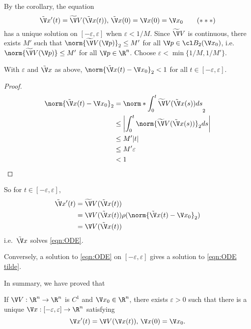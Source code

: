 \documentclass[a4paper]{article}
\theoremstyle{definition}
\begin{document}
By the corollary, the equation
\begin{equation*}
  \label{eqn:ODE tilde}
  \tilde \V x'(t) = \widetilde \V V(\tilde \V x(t)), \, \tilde \V x(0) = \V x(0) = \V x_0
  \tag{\(\ast\ast\ast\)}
\end{equation*}
has a unique solution on \([-\varepsilon, \varepsilon]\) when \(\varepsilon < 1/M\). Since \(\widetilde \V V\) is continuous, there exists \(M'\) such that \(\norm{\widetilde \V V(\V p)}_2 \leq M'\) for all \(\V p \in \cl B_2(\V x_0)\), i.e.\ \(\norm{\widetilde \V V(\V p)} \leq M'\) for all \(\V p \in \R^n\). Choose \(\varepsilon < \min\{1/M, 1/M'\}\).

\begin{lemma}
  With \(\varepsilon\) and \(\tilde \V x\) as above, \(\norm{\tilde \V x(t) - \V x_0}_2 < 1\) for all \(t \in [-\varepsilon, \varepsilon]\).
\end{lemma}

\begin{proof}
  \begin{align*}
    \norm{\tilde \V x(t) - \V x_0}_2 &= \norm*{\int_0^t \widetilde \V V(\tilde \V x(s)) ds}_2 \\
                                     &\leq \left| \int_0^t \norm{\widetilde \V V(\tilde \V x(s))}_2 ds \right| \\
                                     &\leq M'|t| \\
                                     &\leq M'\varepsilon \\
                                     &< 1
  \end{align*}
\end{proof}

So for \(t \in [-\varepsilon, \varepsilon]\),
\begin{align*}
  \tilde \V x'(t) &= \widetilde \V V(\tilde \V x(t)) \\
                  &= \V V(\tilde \V x(t)) \rho(\norm{\tilde \V x(t) - \V x_0}_2) \\
                  &= \V V(\tilde \V x(t))
\end{align*}
i.e.\ \(\tilde \V x\) solves \eqref{eqn:ODE}.

Conversely, a solution to \eqref{eqn:ODE} on \([-\varepsilon, \varepsilon]\) gives a solution to \eqref{eqn:ODE tilde}.

In summary, we have proved that

\begin{theorem}
  If \(\V V: \R^n \to \R^n\) is \(C^1\) and \(\V x_0 \in \R^n\), there exists \(\varepsilon > 0\) such that there is a unique \(\V x: [-\varepsilon, \varepsilon] \to \R^n\) satisfying
  \[
    \V x'(t) = \V V(\V x(t)), \, \V x(0) = \V x_0.
  \]
\end{theorem}
\end{document}
